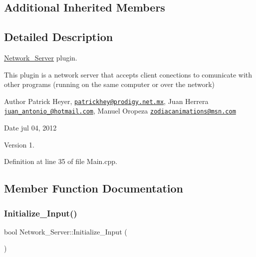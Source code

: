 \subsection*{Additional Inherited Members}


\subsection{Detailed Description}
\hyperlink{class_network___server}{Network\+\_\+\+Server} plugin. 

This plugin is a network server that accepts client conections to comunicate with other programs (running on the same computer or over the network) \begin{DoxyAuthor}{Author}
Patrick Heyer, \href{mailto:patrickhey@prodigy.net.mx}{\tt patrickhey@prodigy.\+net.\+mx}, Juan Herrera \href{mailto:juan_antonio_@hotmail.com}{\tt juan\+\_\+antonio\+\_\+@hotmail.\+com}, Manuel Oropeza \href{mailto:zodiacanimations@msn.com}{\tt zodiacanimations@msn.\+com} 
\end{DoxyAuthor}
\begin{DoxyDate}{Date}
jul 04, 2012 
\end{DoxyDate}
\begin{DoxyVersion}{Version}
1. 
\end{DoxyVersion}


Definition at line 35 of file Main.\+cpp.



\subsection{Member Function Documentation}
\mbox{\label{class_network___server_ad5129bb2f3bcf2480a33a42a36cd5352}} 
\subsubsection{\texorpdfstring{Initialize\+\_\+\+Input()}{Initialize\_Input()}}
{\footnotesize\ttfamily bool Network\+\_\+\+Server\+::\+Initialize\+\_\+\+Input (\begin{DoxyParamCaption}{ }\end{DoxyParamCaption})\hspace{0.3cm}{\ttfamily [virtual]}}



